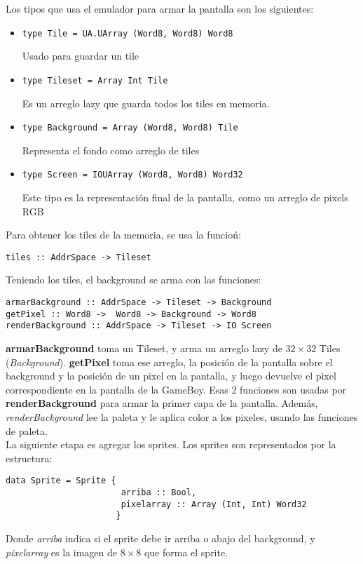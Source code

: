 \documentclass[a4paper,10pt]{report}
\begin{document}
Los tipos que usa el emulador para armar la pantalla son los siguientes:
\begin{itemize}
  \item \begin{verbatim}type Tile = UA.UArray (Word8, Word8) Word8\end{verbatim} Usado para guardar un tile
  \item \begin{verbatim}type Tileset = Array Int Tile\end{verbatim} Es un arreglo lazy que guarda todos los tiles en memoria.
  \item \begin{verbatim}type Background = Array (Word8, Word8) Tile\end{verbatim} Representa el fondo como arreglo de tiles
  \item \begin{verbatim}type Screen = IOUArray (Word8, Word8) Word32 \end{verbatim} Este tipo es la representación final de la pantalla, como un arreglo de pixels RGB
\end{itemize}

Para obtener los tiles de la memoria, se usa la funcioń:
\begin{verbatim}
tiles :: AddrSpace -> Tileset
\end{verbatim}

Teniendo los tiles, el background se arma con las funciones:
\begin{verbatim}
armarBackground :: AddrSpace -> Tileset -> Background
getPixel :: Word8 ->  Word8 -> Background -> Word8
renderBackground :: AddrSpace -> Tileset -> IO Screen
\end{verbatim}
\textbf{armarBackground} toma un Tileset, y arma un arreglo lazy de $32\times32$ Tiles (\textit{Background}). \textbf{getPixel} toma ese arreglo, la posición de la pantalla sobre el background y la posición de un pixel en la pantalla, y luego devuelve el pixel correspondiente en la pantalla de la GameBoy. Esas 2 funciones son usadas por \textbf{renderBackground} para armar la primer capa de la pantalla. Además, \textit{renderBackground} lee la paleta y le aplica color a los pixeles, usando las funciones de paleta.\\

La siguiente etapa es agregar los sprites. Los sprites son representados por la estructura:
\begin{verbatim}
data Sprite = Sprite {
                       arriba :: Bool, 
                       pixelarray :: Array (Int, Int) Word32
                      }
\end{verbatim}
Donde \textit{arriba} indica si el sprite debe ir arriba o abajo del background, y \textit{pixelarray} es la imagen de $8\times8$ que forma el sprite.
\end{document}
